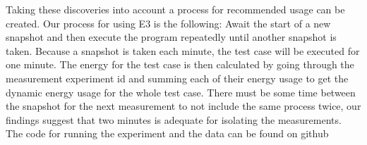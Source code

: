 Taking these discoveries into account a process for recommended usage can be created. Our process for using E3 is the following: Await the start of a new snapshot and then execute the program repeatedly until another snapshot is taken. Because a snapshot is taken each minute, the test case will be executed for one minute. The energy for the test case is then calculated by going through the measurement experiment id and summing each of their energy usage to get the dynamic energy usage for the whole test case. There must be some time between the snapshot for the next measurement to not include the same process twice, our findings suggest that two minutes is adequate for isolating the measurements. The code for running the experiment and the data can be found on github    